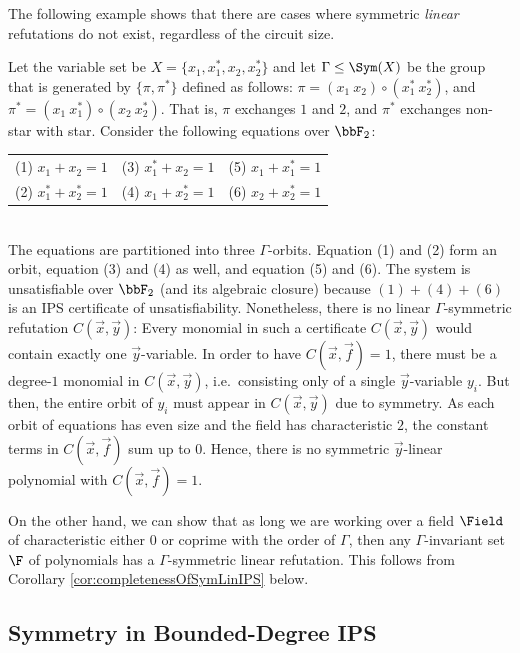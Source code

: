 \documentclass[a4paper,UKenglish,cleveref, autoref, thm-restate]{lipics-v2021}
\begin{document}
The following example shows that there are cases where symmetric \emph{linear} refutations do not exist, regardless of the circuit size.
\begin{example}
	\label{ex:incompletenessOfSymHilbert}
	Let the variable set be $X = \{x_1, x_1^*, x_2, x_2^*\}$ and let $\Gamma \leq \Sym(X)$ be the group that is generated by $\{\pi,\pi^*\}$ defined as follows: $\pi = (x_1 \ x_2) \circ (x_1^* \ x_2^*)$, and $\pi^* = (x_1 \ x_1^*) \circ (x_2 \ x_2^*)$. That is, $\pi$ exchanges $1$ and $2$, and $\pi^*$ exchanges non-star with star. Consider the following equations over $\bbF_2$:\\
	\begin{tabular}{ccc}
		 (1) $x_1 + x_2 = 1$       &   (3) $x_1^*+x_2 = 1$       &  (5) $x_1 + x_1^* = 1$       \\
		  (2) $x_1^* + x_2^* = 1$ & (4) $x_1+x_2^* = 1$ & (6) $x_2 + x_2^* = 1$\\
	\end{tabular}	 
	~\\
	The equations are partitioned into three $\Gamma$-orbits. Equation (1) and (2) form an orbit, equation (3) and (4) as well, and equation (5) and (6).
	The system is unsatisfiable over $\bbF_2$ (and its algebraic closure) because $(1)+(4)+(6)$ is an IPS certificate of unsatisfiability.
	Nonetheless, there is no linear $\Gamma$-symmetric refutation $C(\vec x, \vec y)$: 
	Every monomial in such a certificate $C(\vec x, \vec y)$ would contain exactly one $\vec y$-variable. 
	In order to have $C(\vec x, \vec f) = 1$, there must be a degree-$1$ monomial in $C(\vec x, \vec y)$, i.e.\ consisting only of a single $\vec y$-variable $y_i$. But then, the entire orbit of $y_i$ must appear in $C(\vec x, \vec y)$ due to symmetry. As each orbit of equations has even size and the field has characteristic $2$, the constant terms in $C(\vec x, \vec f)$ sum up to $0$. Hence, there is no symmetric $\vec y$-linear polynomial with $C(\vec x, \vec f) = 1$.
\end{example}	 

On the other hand, we can show that as long we are working over a field $\Field$ of characteristic either $0$ or coprime with the order of $\Gamma$, then any $\Gamma$-invariant set $\F$ of polynomials has a $\Gamma$-symmetric linear refutation.  This follows from Corollary \ref{cor:completenessOfSymLinIPS} below.




\subsection{Symmetry in Bounded-Degree IPS}
\end{document}
